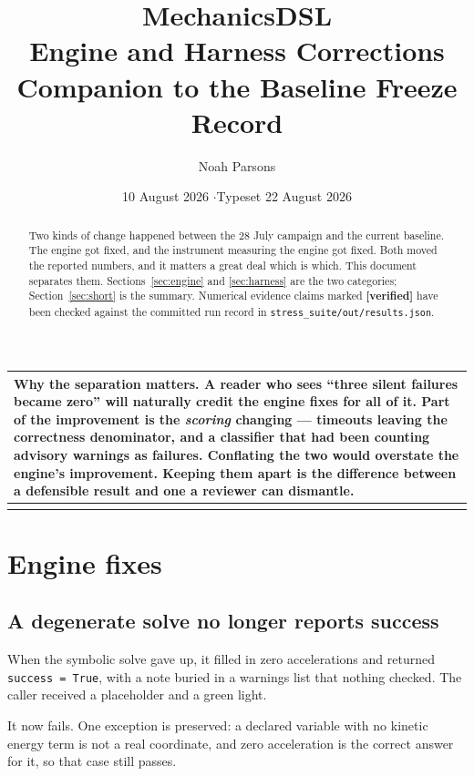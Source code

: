 \documentclass[11pt,a4paper]{article}
\title{\textbf{MechanicsDSL}\\[0.4em]
       \large Engine and Harness Corrections\\[0.2em]
       \large Companion to the Baseline Freeze Record}
\author{Noah Parsons}
\date{10 August 2026 \quad$\cdot$\quad Typeset 22 August 2026}
\makeatletter
\newenvironment{callout}
  {\par\medskip\noindent\begin{tabular}{@{}p{0.94\textwidth}@{}}
   \arrayrulecolor{warnrule}\hline\rule{0pt}{2.6ex}}
  {\\[0.8ex]\hline\arrayrulecolor{black}\end{tabular}\par\medskip}
\newcommand{\vconf}{\textcolor{okgreen}{\textbf{[verified]}}}
\makeatother
\begin{document}
\maketitle

\begin{abstract}
\noindent
Two kinds of change happened between the 28 July campaign and the current
baseline. The engine got fixed, and the instrument measuring the engine got
fixed. Both moved the reported numbers, and it matters a great deal which is
which. This document separates them. Sections~\ref{sec:engine} and
\ref{sec:harness} are the two categories; Section~\ref{sec:short} is the
summary. Numerical evidence claims marked \vconf{} have been checked against
the committed run record in \texttt{stress\_suite/out/results.json}.
\end{abstract}

\tableofcontents
\bigskip

\begin{callout}
\textbf{Why the separation matters.} A reader who sees ``three silent failures
became zero'' will naturally credit the engine fixes for all of it. Part of the
improvement is the \emph{scoring} changing --- timeouts leaving the
correctness denominator, and a classifier that had been counting advisory
warnings as failures. Conflating the two would overstate the engine's
improvement. Keeping them apart is the difference between a defensible result
and one a reviewer can dismantle.
\end{callout}

\section{Engine fixes}\label{sec:engine}

\subsection{A degenerate solve no longer reports success}

When the symbolic solve gave up, it filled in zero accelerations and returned
\texttt{success = True}, with a note buried in a warnings list that nothing
checked. The caller received a placeholder and a green light.

It now fails. One exception is preserved: a declared variable with no kinetic
energy term is not a real coordinate, and zero acceleration is the correct
answer for it, so that case still passes.
\end{document}
